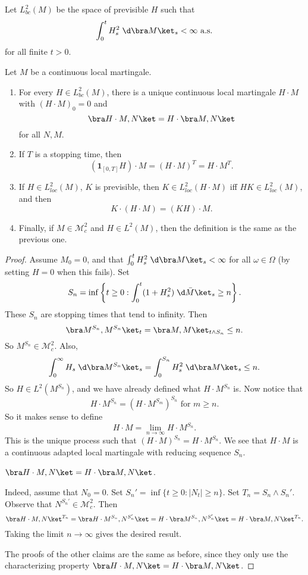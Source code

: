 \documentclass[a4paper]{article}
\begin{document}
\begin{defi}[$L_{bc}^2(M)$]
  Let $L_{bc}^2(M)$ be the space of previsible $H$ such that
  \[
    \int_0^t H_s^2 \;\d \bra M\ket_s < \infty\text{ a.s.}
  \]
  for all finite $t > 0$.
\end{defi}

\begin{thm}
  Let $M$ be a continuous local martingale.
  \begin{enumerate}
    \item For every $H \in L_{bc}^2(M)$, there is a unique continuous local martingale $H \cdot M$ with $(H \cdot M)_0= 0 $ and
      \[
        \bra H \cdot M, N\ket = H \cdot \bra M, N\ket
      \]
      for all $N, M$.
    \item If $T$ is a stopping time, then
      \[
        (\mathbf{1}_{[0, T]}H) \cdot M = (H \cdot M)^T = H \cdot M^T.
      \]
    \item If $H \in L^2_{loc}(M)$, $K$ is previsible, then $K \in L^2_{loc}(H \cdot M)$ iff $HK \in L^2_{loc}(M)$, and then
      \[
        K \cdot (H \cdot M) = (KH) \cdot M.
      \]
    \item Finally, if $M \in \mathcal{M}_c^2$ and $H \in L^2(M)$, then the definition is the same as the previous one.
  \end{enumerate}
\end{thm}

\begin{proof}
  Assume $M_0 = 0$, and that $\int_0^t H_s^2 \;\d \bra M\ket_s < \infty$ for all $\omega \in \Omega$ (by setting $H = 0$ when this fails). Set
  \[
    S_n = \inf \left\{ t \geq 0 : \int_0^t (1 + H_s^2) \;\d \bar M \ket_s \geq n\right\}.
  \]
  These $S_n$ are stopping times that tend to infinity. Then
  \[
    \bra M^{S_n}, M^{S_n}\ket_t = \bra M, M\ket_{t \wedge S_n} \leq n.
  \]
  So $M^{S_n} \in \mathcal{M}_c^2$. Also,
  \[
    \int_0^\infty H_s \;\d \bra M^{S_n}\ket_s = \int_0^{S_n} H_s^2 \;\d \bra M\ket_s \leq n.
  \]
  So $H \in L^2(M^{S_n})$, and we have already defined what $H \cdot M^{S_n}$ is. Now notice that
  \[
    H \cdot M^{S_n} = (H \cdot M^{S_m})^{S_n}\text{ for }m \geq n.
  \]
  So it makes sense to define
  \[
    H \cdot M = \lim_{n \to \infty} H \cdot M^{S_n}.
  \]
  This is the unique process such that $(H \cdot M)^{S_n} = H \cdot M^{S_n}$. We see that $H \cdot M$ is a continuous adapted local martingale with reducing sequence $S_n$.
  \begin{claim}
    $\bra H \cdot M, N\ket = H \cdot \bra M, N\ket$.
  \end{claim}
  Indeed, assume that $N_0 = 0$. Set $S_n' = \inf \{t \geq 0: |N_t| \geq n\}$. Set $T_n = S_n \wedge S_n'$. Observe that $N^{S_n'} \in \mathcal{M}_c^2$. Then
  \[
    \bra H \cdot M, N\ket^{T_n} = \bra H \cdot M^{S_n}, N^{S_n'}\ket = H \cdot \bra M^{S_n}, N^{S_n'}\ket = H \cdot \bra M, N\ket^{T_n}.
  \]
  Taking the limit $n \to \infty$ gives the desired result.

  The proofs of the other claims are the same as before, since they only use the characterizing property $\bra H \cdot M, N\ket = H \cdot \bra M, N\ket$.
\end{proof}
\end{document}
